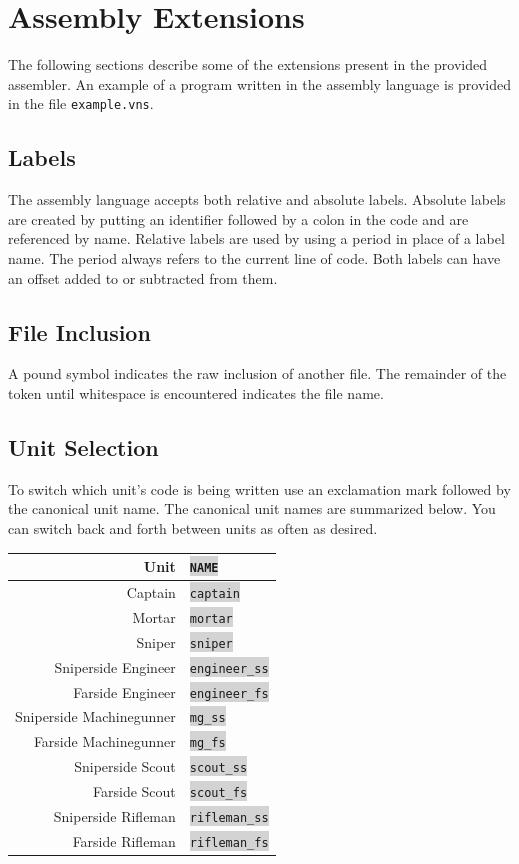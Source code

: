 \documentclass{article}
\newcommand{\vnscode}[1]{\colorbox{lightgray}{\lstinline[language=vns]{#1}}}
\begin{document}
\section{Assembly Extensions}

The following sections describe some of the extensions present in the provided
assembler. An example of a program written in the assembly language is provided
in the file \texttt{example.vns}.

\subsection{Labels}

The assembly language accepts both relative and absolute labels. Absolute labels
are created by putting an identifier followed by a colon in the code and are
referenced by name. Relative labels are used by using a period in place of a
label name. The period always refers to the current line of code. Both labels
can have an offset added to or subtracted from them.

\subsection{File Inclusion}

A pound symbol indicates the raw inclusion of another file. The remainder of the
token until whitespace is encountered indicates the file name.

\subsection{Unit Selection}

To switch which unit's code is being written use an exclamation mark followed by
the canonical unit name. The canonical unit names are summarized below. You can
switch back and forth between units as often as desired.

\begin{minipage}{\textwidth}
\centering
\begin{tabular}{rl}
    \hline Unit & \vnscode{NAME} \\ \hline
    Captain & \vnscode{captain} \\
    Mortar & \vnscode{mortar} \\
    Sniper & \vnscode{sniper} \\
    Sniperside Engineer & \vnscode{engineer_ss} \\
    Farside Engineer & \vnscode{engineer_fs} \\
    Sniperside Machinegunner & \vnscode{mg_ss} \\
    Farside Machinegunner & \vnscode{mg_fs} \\
    Sniperside Scout & \vnscode{scout_ss} \\
    Farside Scout & \vnscode{scout_fs} \\
    Sniperside Rifleman & \vnscode{rifleman_ss} \\
    Farside Rifleman & \vnscode{rifleman_fs} \\
\end{tabular}
\end{minipage}
\end{document}
